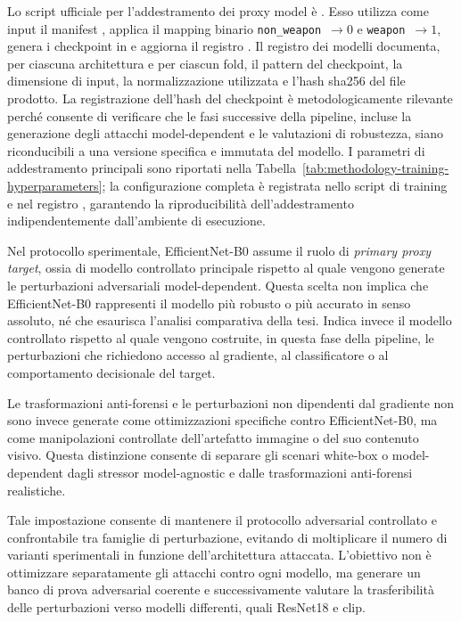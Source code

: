 Lo script ufficiale per l'addestramento dei proxy model è
. Esso utilizza come input
il manifest ,
applica il mapping binario \texttt{non\_weapon}~$\rightarrow 0$ e
\texttt{weapon}~$\rightarrow 1$, genera i checkpoint in
 e aggiorna il registro
. Il registro dei modelli documenta, per
ciascuna architettura e per ciascun fold, il pattern del checkpoint, la
dimensione di input, la normalizzazione utilizzata e l'hash \gls{sha256} del file
prodotto. La registrazione dell'hash del checkpoint è metodologicamente rilevante
perché consente di verificare che le fasi successive della pipeline, incluse la
generazione degli attacchi model-dependent e le valutazioni di robustezza, siano
riconducibili a una versione specifica e immutata del modello. I parametri di addestramento principali sono riportati nella
Tabella~\ref{tab:methodology-training-hyperparameters}; la configurazione
completa è registrata nello script di training e nel registro
, garantendo la riproducibilità
dell'addestramento indipendentemente dall'ambiente di esecuzione.

Nel protocollo sperimentale, EfficientNet-B0 assume il ruolo di \textit{primary proxy target}, ossia di
modello controllato principale rispetto al quale vengono generate le
perturbazioni adversariali model-dependent. Questa scelta non implica che
EfficientNet-B0 rappresenti il modello più robusto o più accurato in senso assoluto, né che esaurisca
l'analisi comparativa della tesi. Indica invece il modello controllato rispetto al quale vengono costruite,
in questa fase della pipeline, le perturbazioni che richiedono accesso al gradiente, al classificatore
o al comportamento decisionale del target.

Le trasformazioni anti-forensi e le perturbazioni non dipendenti dal gradiente
non sono invece generate come ottimizzazioni specifiche contro EfficientNet-B0,
ma come manipolazioni controllate dell'artefatto immagine o del suo contenuto
visivo. Questa distinzione consente di separare gli scenari white-box o
model-dependent dagli stressor model-agnostic e dalle trasformazioni
anti-forensi realistiche.


Tale impostazione consente di mantenere il protocollo adversarial
controllato e confrontabile tra famiglie di perturbazione, evitando di moltiplicare il
numero di varianti sperimentali in funzione dell'architettura attaccata.
L'obiettivo non è ottimizzare separatamente gli attacchi contro ogni modello, ma generare un banco di
prova adversarial coerente e successivamente valutare la trasferibilità delle perturbazioni verso modelli
differenti, quali ResNet18 e \gls{clip}.


